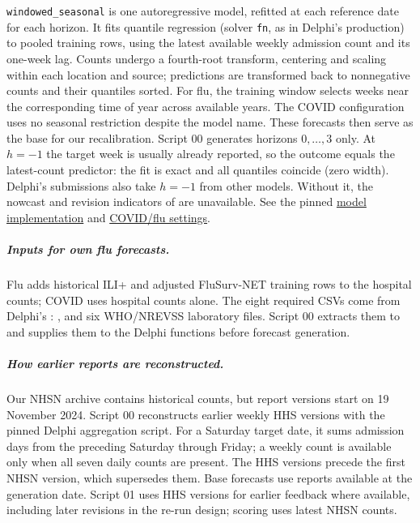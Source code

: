 \documentclass[11pt,a4paper]{article}
\theoremstyle{definition}
\theoremstyle{remark}
\begin{document}
\texttt{windowed\_seasonal} is one autoregressive model, refitted at each
reference date for each horizon. It fits quantile regression (solver
\texttt{fn}, as in Delphi's production) to pooled training rows, using
the latest available weekly admission count and its one-week lag. Counts undergo a fourth-root transform, centering and scaling
within each location and source; predictions are transformed back to
nonnegative counts and their quantiles sorted. For flu, the training window
selects weeks near the corresponding time of year across available years.
The COVID configuration uses no seasonal restriction despite the model
name. These forecasts then serve as the base for our recalibration.
Script 00 generates horizons $0,\ldots,3$ only. At $h=-1$ the target week
is usually already reported, so the outcome equals the latest-count
predictor: the fit is exact and all quantiles coincide (zero width).
Delphi's submissions also take $h=-1$ from other models. Without it,
the nowcast and revision indicators of
 are unavailable.
See the pinned \href{https://github.com/cmu-delphi/delphi-hub-forecasting/blob/9abebcfbcd4330aae5314fae51c5e8e5524675b5/R/forecasters/forecaster_scaled_pop_seasonal.R}{model implementation}
and \href{https://github.com/cmu-delphi/delphi-hub-forecasting/blob/9abebcfbcd4330aae5314fae51c5e8e5524675b5/scripts/calibration/calibration_harness.R}{COVID/flu settings}.

\subparagraph{Inputs for own flu forecasts.}
Flu adds historical ILI+ and adjusted FluSurv-NET training rows to the
hospital counts; COVID uses hospital counts alone. The eight required
CSVs come from Delphi's : ,
 and six WHO/NREVSS laboratory files. Script 00
extracts them to  and supplies
them to the Delphi functions before forecast generation.

\subparagraph{How earlier reports are reconstructed.}
Our NHSN archive contains historical counts, but report versions start
on 19 November 2024. Script 00 reconstructs earlier weekly HHS
versions with the pinned Delphi aggregation script. For a Saturday target
date, it sums admission days from the preceding Saturday through Friday;
a weekly count is available only when all seven daily counts are present.
The HHS versions precede the first NHSN version, which supersedes them.
Base forecasts use reports available at the generation date. Script 01
uses HHS versions for earlier feedback where available, including later
revisions in the re-run design; scoring uses latest NHSN counts.
\end{document}
